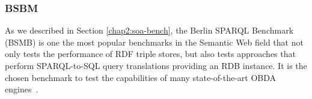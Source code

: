\subsubsection{BSBM}
As we described in Section \ref{chap2:soa-bench}, the Berlin SPARQL Benchmark~\citep{bizer2009berlin} (BSMB) is one the most popular benchmarks in the Semantic Web field that not only tests the performance of RDF triple stores, but also tests approaches that perform SPARQL-to-SQL query translations providing an RDB instance. It is the chosen benchmark to test the capabilities of many state-of-the-art OBDA engines~\citep{priyatna2014formalisation,calvanese2017ontop,mami2019squerall}. 
 
\begin{figure}[!ht]
  \centering
  \qquad
\end{figure}
